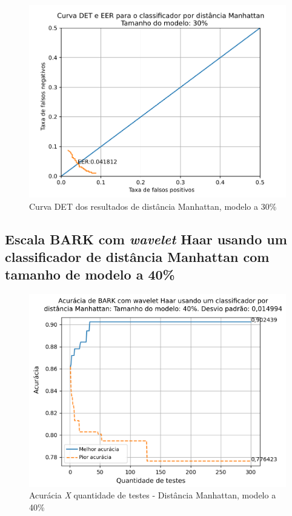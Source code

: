 			\begin{figure}[!ht]
				\centering
				\includegraphics[width=.6\linewidth]{images/results/det/DET_for_classifier_Manhattan_30}
				\caption{Curva DET dos resultados de distância Manhattan, modelo a 30\%}
				\label{fig:detforclassifiermanhattan30}
			\end{figure}
			
			\FloatBarrier
		\subsection{Escala BARK com \textit{wavelet} Haar usando um classificador de distância Manhattan com tamanho de modelo a 40\%}
		
			
			
			\begin{figure}[!ht]
				\centering
				\includegraphics[width=.6\linewidth]{images/results/confusionMatrices/classifier_Manhattan_40.png}
				\caption{Acurácia \textit{X} quantidade de testes - Distância Manhattan, modelo a 40\%}
				\label{fig:classifiermanhattan40}
			\end{figure}
		
